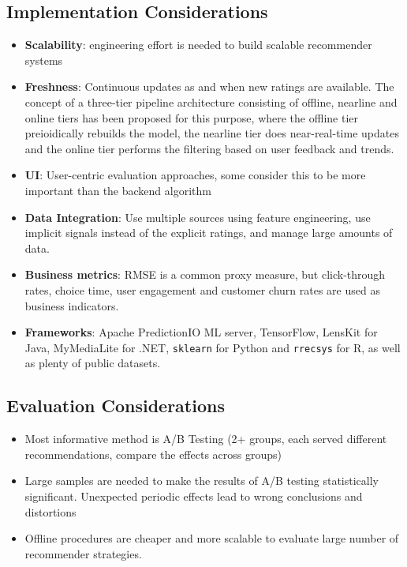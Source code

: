 \documentclass{article}
\begin{document}
\subsection{Implementation Considerations}
\begin{itemize}
    \item \textbf{Scalability}: engineering effort is needed to build scalable recommender systems
    
    \item \textbf{Freshness}: Continuous updates as and when new ratings are available. The concept of a three-tier pipeline architecture consisting of offline, nearline and online tiers has been proposed for this purpose, where the offline tier preioidically rebuilds the model, the nearline tier does near-real-time updates and the online tier performs the filtering based on user feedback and trends. 
    
    \item \textbf{UI}: User-centric evaluation approaches, some consider this to be more important than the backend algorithm
    
    \item \textbf{Data Integration}: Use multiple sources using feature engineering, use implicit signals instead of the explicit ratings, and manage large amounts of data. 
    
    \item \textbf{Business metrics}: RMSE is a common proxy measure, but click-through rates, choice time, user engagement and customer churn rates are used as business indicators.
    
    \item \textbf{Frameworks}: Apache PredictionIO ML server, TensorFlow, LensKit for Java, MyMediaLite for .NET, \texttt{sklearn} for Python and \texttt{rrecsys} for R, as well as plenty of public datasets. 
\end{itemize}

\subsection{Evaluation Considerations}
\begin{itemize}
    \item Most informative method is A/B Testing (2+ groups, each served different recommendations, compare the effects across groups)
    
    \item Large samples are needed to make the results of A/B testing statistically significant. Unexpected periodic effects lead to wrong conclusions and distortions
    
    \item Offline procedures are cheaper and more scalable to evaluate large number of recommender strategies.
\end{itemize}
\end{document}

